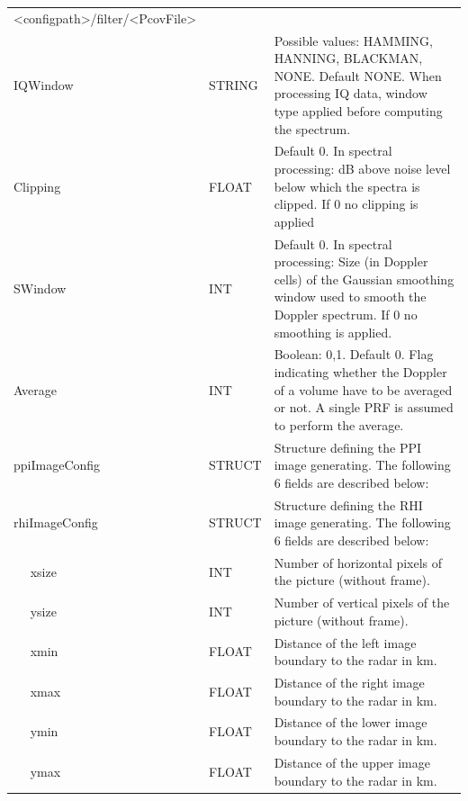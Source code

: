 \documentclass[a4paper,11pt,pdftex,twoside]{scrartcl}
\begin{document}
{{{\begin{longtable}{p{}p{}p{}}
                                 <configpath>/filter/<PcovFile>\\
IQWindow & STRING & Possible values: HAMMING, HANNING, BLACKMAN, NONE. Default NONE. When processing IQ data, window type applied before computing the spectrum.\\
Clipping & FLOAT & Default 0. In spectral processing: dB above noise level below which the spectra is clipped. If 0 no clipping is applied\\
SWindow & INT & Default 0. In spectral processing: Size (in Doppler cells) of the Gaussian smoothing window used to smooth the Doppler spectrum. If 0 no smoothing is applied.\\
Average & INT & Boolean: 0,1. Default 0. Flag indicating whether the Doppler of a volume have to be averaged or not. A single PRF is assumed to perform the average.\\
ppiImageConfig     & STRUCT    & Structure defining the PPI image generating. The following 6
                                 fields are described below:\\
rhiImageConfig     & STRUCT    & Structure defining the RHI image generating. The following 6
                                 fields are described below:\\
$\quad$ xsize      & INT       & Number of horizontal pixels of the picture (without frame).\\
$\quad$ ysize      & INT       & Number of vertical pixels of the picture (without frame).\\
$\quad$ xmin       & FLOAT     & Distance of the left image boundary to the radar in km.\\
$\quad$ xmax       & FLOAT     & Distance of the right image boundary to the radar in km.\\
$\quad$ ymin       & FLOAT     & Distance of the lower image boundary to the radar in km.\\
$\quad$ ymax       & FLOAT     & Distance of the upper image boundary to the radar in km.\\


\end{longtable}}}}
\end{document}
